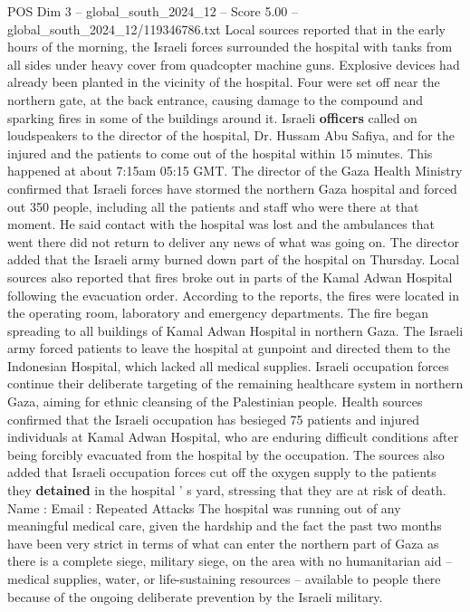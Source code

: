 \begin{textsample}{POS Dim 3 – global\_south\_2024\_12 – Score 5.00 – global\_south\_2024\_12/119346786.txt}  \label{ex:f3_pos_395}
Local sources reported that in the early hours of the morning, the Israeli forces surrounded the hospital with tanks from all sides under heavy cover from quadcopter machine guns.
Explosive devices had already been planted in the vicinity of the hospital.
Four were set off near the northern gate, at the back entrance, causing damage to the compound and sparking fires in some of the buildings around it.
Israeli \textbf{officers} called on loudspeakers to the director of the hospital, Dr.
Hussam Abu Safiya, and for the injured and the patients to come out of the hospital within 15 minutes.
This happened at about 7:15am 05:15 GMT.
The director of the Gaza Health Ministry confirmed that Israeli forces have stormed the northern Gaza hospital and forced out 350 people, including all the patients and staff who were there at that moment.
He said contact with the hospital was lost and the ambulances that went there did not return to deliver any news of what was going on.
The director added that the Israeli army burned down part of the hospital on Thursday.
Local sources also reported that fires broke out in parts of the Kamal Adwan Hospital following the evacuation order.
According to the reports, the fires were located in the operating room, laboratory and emergency departments.
The fire began spreading to all buildings of Kamal Adwan Hospital in northern Gaza.
The Israeli army forced patients to leave the hospital at gunpoint and directed them to the Indonesian Hospital, which lacked all medical supplies.
Israeli occupation forces continue their deliberate targeting of the remaining healthcare system in northern Gaza, aiming for ethnic cleansing of the Palestinian people.
Health sources confirmed that the Israeli occupation has besieged 75 patients and injured individuals at Kamal Adwan Hospital, who are enduring difficult conditions after being forcibly evacuated from the hospital by the occupation.
The sources also added that Israeli occupation forces cut off the oxygen supply to the patients they \textbf{detained} in the hospital ' s yard, stressing that they are at risk of death.
Name : Email : Repeated Attacks The hospital was running out of any meaningful medical care, given the hardship and the fact the past two months have been very strict in terms of what can enter the northern part of Gaza as there is a complete siege, military siege, on the area with no humanitarian aid -- medical supplies, water, or life-sustaining resources -- available to people there because of the ongoing deliberate prevention by the Israeli military.

\end{textsample}
